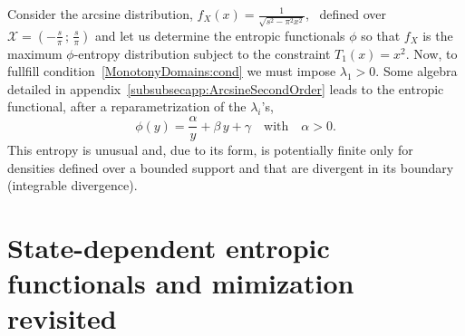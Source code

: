 \documentclass[entropy,article,submit,moreauthors,pdftex]{Definitions/mdpi}
\newcounter{arcsineExample}%
\newcommand{\SZ}[1]{{\color{blue} #1}}                                       %
\def\X{\mathcal{X}}%
\begin{document}
%
\begin{Example}\label{arcsine:ex}\setcounter{arcsineExample}{\value{example}}
   Consider the  arcsine distribution, \SZ{$f_X(x) =  \frac{1}{\sqrt{s^2 - \pi^2
         x^2}}$,  \   defined  over  $\X   =  \left(  -\frac{s}{\pi}  \,   ;  \,
     \frac{s}{\pi}  \right)$}  and let  us  determine  the entropic  functionals
   $\phi$ so  that $f_X$ is  the maximum $\phi$-entropy distribution  subject to
   the     constraint     $T_1(x)     =      x^2$.      Now,     to     fullfill
   condition~\ref{MonotonyDomains:cond} we  must impose  $\lambda_1 >  0$.  Some
   algebra \SZ{detailed in appendix~\ref{subsubsecapp:ArcsineSecondOrder}} leads
   to   the   entropic   functional,    after   a   reparametrization   of   the
   $\lambda_i$'s,  $$\phi(y) =  \frac{\alpha}{y} +  \beta  \, y  + \gamma  \quad
   \mbox{with} \quad \alpha > 0.$$ This entropy is unusual and, due to its form,
   is potentially finite  only for densities defined over a  bounded support and
   that are divergent in its boundary (integrable divergence).
\end{Example}




\section{State-dependent entropic functionals and mimization revisited}
\label{sec:MultiformEnt}
\end{document}
